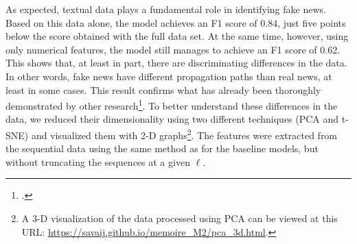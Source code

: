 \documentclass[a4paper,twoside,12pt]{book}
\begin{document}
As expected, textual data plays a fundamental role in identifying fake news. Based on this data alone, the model achieves an F1 score of 0.84, just five points below the score obtained with the full data set. At the same time, however, using only numerical features, the model still manages to achieve an F1 score of 0.62. This shows that, at least in part, there are discriminating differences in the data. In other words, fake news have different propagation paths than real news, at least in some cases. This result confirms what has already been thoroughly demonstrated by other research\footcite{vosoughi2018}. To better understand these differences in the data, we reduced their dimensionality using two different techniques (PCA and t-SNE) and visualized them with 2-D graphs\footnote{A 3-D visualization of the data processed using PCA can be viewed at this URL: \url{https://savaij.github.io/memoire_M2/pca_3d.html}.}. The features were extracted from the sequential data using the same method as for the baseline models, but without truncating the sequences at a given $\ell$.
\end{document}
